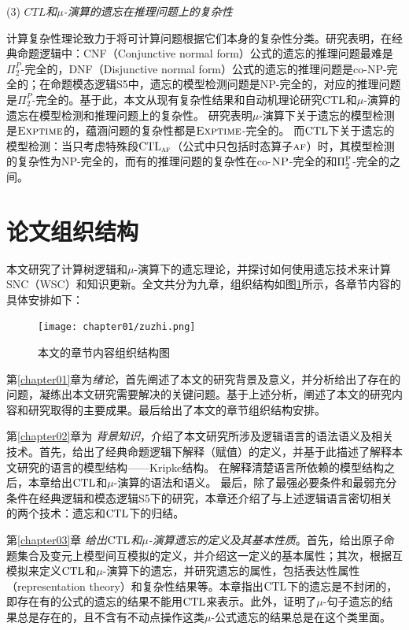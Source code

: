 (3) {\em $CTL$和$\mu$-演算的遗忘在推理问题上的复杂性}

计算复杂性理论致力于将可计算问题根据它们本身的复杂性分类。研究表明，在经典命题逻辑中：CNF（Conjunctive normal form）公式的遗忘的推理问题最难是$\Pi_2^P$-完全的，DNF（Disjunctive normal form）公式的遗忘的推理问题是co-NP-完全的；在命题模态逻辑S5中，遗忘的模型检测问题是NP-完全的，对应的推理问题是$\Pi_2^P$-完全的。基于此，本文从现有复杂性结果和自动机理论研究$\textrm{CTL}$和$\mu$-演算的遗忘在模型检测和推理问题上的复杂性。
研究表明$\mu$-演算下关于遗忘的模型检测是$\textsc{Exptime}$的，蕴涵问题的复杂性都是$\textsc{Exptime}$-完全的。
而$\textrm{CTL}$下关于遗忘的模型检测：当只考虑特殊段$\textrm{CTL}_{\textsc{a} \textsc{f}}$（公式中只包括时态算子$\textsc{a} \textsc{f}$）时，其模型检测的复杂性为\textsc{NP}-完全的，而有的推理问题的复杂性在co-$\textsc{NP}$-完全的和$\Pi_2^{\textsc{P}}$-完全的之间。








\section{论文组织结构}
本文研究了计算树逻辑和$\mu$-演算下的遗忘理论，并探讨如何使用遗忘技术来计算SNC（WSC）和知识更新。全文共分为九章，组织结构如图\ref{fig:chapter1-research-structure}所示，各章节内容的具体安排如下：


\begin{figure}[htbp]
	\centering
	\texttt{[image: chapter01/zuzhi.png]}
	\caption{本文的章节内容组织结构图}
	\label{fig:chapter1-research-structure}
\end{figure}

第\ref{chapter01}章为\textit{绪论}，首先阐述了本文的研究背景及意义，并分析给出了存在的问题，凝练出本文研究需要解决的关键问题。基于上述分析，阐述了本文的研究内容和研究取得的主要成果。最后给出了本文的章节组织结构安排。


第\ref{chapter02}章为 {\em 背景知识}，介绍了本文研究所涉及逻辑语言的语法语义及相关技术。首先，给出了经典命题逻辑下解释（赋值）的定义，并基于此描述了解释本文研究的语言的模型结构——Kripke结构。
在解释清楚语言所依赖的模型结构之后，本章给出$\textrm{CTL}$和$\mu$-演算的语法和语义。
最后，除了最强必要条件和最弱充分条件在经典逻辑和模态逻辑S5下的研究，本章还介绍了与上述逻辑语言密切相关的两个技术：遗忘和$\textrm{CTL}$下的归结。



第\ref{chapter03}章 {\em 给出$\textrm{CTL}$和$\mu$-演算遗忘的定义及其基本性质}。首先，给出原子命题集合及变元上模型间互模拟的定义，并介绍这一定义的基本属性；其次，根据互模拟来定义$\textrm{CTL}$和$\mu$-演算下的遗忘，并研究遗忘的属性，包括表达性属性（representation theory）和复杂性结果等。本章指出$\textrm{CTL}$下的遗忘是不封闭的，即存在有的公式的遗忘的结果不能用$\textrm{CTL}$来表示。此外，证明了$\mu$-句子遗忘的结果总是存在的，且不含有不动点操作这类$\mu$-公式遗忘的结果总是在这个类里面。

